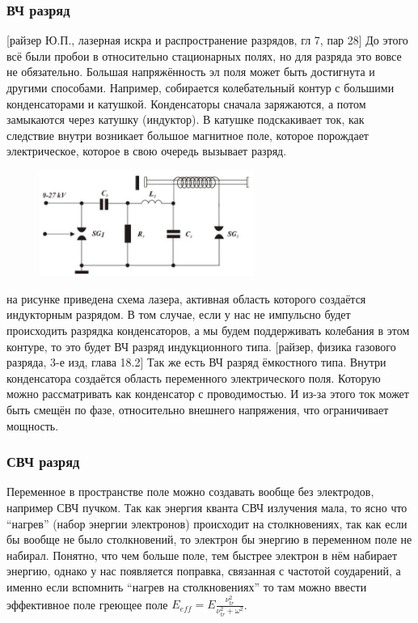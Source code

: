 \documentclass[10pt, a4paper]{article}
\begin{document}
\subsubsection{ВЧ разряд}
[райзер Ю.П., лазерная искра и распространение разрядов, гл 7, пар 28]
До этого всё были пробои в относительно стационарных полях, но для разряда это вовсе не обязательно. Большая напряжённость эл поля может быть достигнута и другими способами. Например, собирается колебательный контур с большими конденсаторами и катушкой. Конденсаторы сначала заряжаются, а потом замыкаются через катушку (индуктор). В катушке подскакивает ток, как следствие внутри возникает большое магнитное поле, которое порождает электрическое, которое в свою очередь вызывает разряд.

\begin{figure}[ht]
	\begin{center}
		\includegraphics[width=70mm]{12.5.jpg}
	\end{center}
\end{figure}

на рисунке приведена схема лазера, активная область которого создаётся индукторным разрядом.
В том случае, если у нас не импульсно будет происходить разрядка конденсаторов, а мы будем поддерживать колебания в этом контуре, то это будет ВЧ разряд индукционного типа.
[райзер, физика газового разряда, 3-е изд, глава 18.2]
Так же есть ВЧ разряд ёмкостного типа. Внутри конденсатора создаётся область переменного электрического поля. Которую можно рассматривать как конденсатор с проводимостью. И из-за этого ток может быть смещён по фазе, относительно внешнего напряжения, что ограничивает мощность.
\subsubsection{СВЧ разряд}
Переменное в пространстве поле можно создавать вообще без электродов, например СВЧ пучком. Так как энергия кванта СВЧ излучения мала, то ясно что “нагрев” (набор энергии электронов) происходит на столкновениях,  так как если бы вообще не было столкновений, то электрон бы энергию в переменном поле не набирал. Понятно, что чем больше поле, тем быстрее электрон в нём набирает энергию, однако у нас появляется поправка, связанная с частотой соударений, а именно если вспомнить “нагрев на столкновениях” то там можно ввести эффективное поле греющее поле $E_{eff}=E \frac{\nu_{tr}^{2}}{\nu_{tr}^{2}+\omega^{2}}$. 
\end{document}
